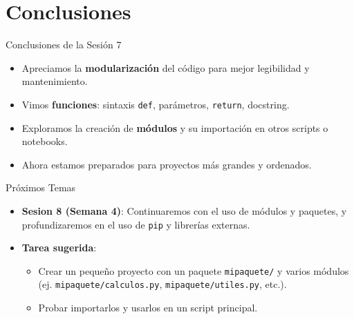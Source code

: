 \documentclass[10pt]{beamer}
\begin{document}
\section{Conclusiones}

\begin{frame}{Conclusiones de la Sesión 7}
  \begin{itemize}
    \item Apreciamos la \textbf{modularización} del código para mejor legibilidad y mantenimiento.
    \item Vimos \textbf{funciones}: sintaxis \texttt{def}, parámetros, \texttt{return}, docstring.
    \item Exploramos la creación de \textbf{módulos} y su importación en otros scripts o notebooks.
    \item Ahora estamos preparados para proyectos más grandes y ordenados.
  \end{itemize}
\end{frame}

\begin{frame}{Próximos Temas}
  \begin{itemize}
    \item \textbf{Sesion 8 (Semana 4)}: Continuaremos con el uso de módulos y paquetes, y profundizaremos en el uso de \texttt{pip} y librerías externas.
    \item \textbf{Tarea sugerida}:
      \begin{itemize}
        \item Crear un pequeño proyecto con un paquete \texttt{mipaquete/} y varios módulos (ej. \texttt{mipaquete/calculos.py}, \texttt{mipaquete/utiles.py}, etc.).
        \item Probar importarlos y usarlos en un script principal.
      \end{itemize}
  \end{itemize}
\end{frame}
\end{document}
